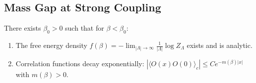 
\subsection{Mass Gap at Strong Coupling}

\begin{theorem}
\label{thm:cluster_proof}
There exists $\beta_0 > 0$ such that for $\beta < \beta_0$:
\begin{enumerate}
\item The free energy density $f(\beta) = -\lim_{|\Lambda| \to \infty} \frac{1}{|\Lambda|}\log Z_\Lambda$ exists and is analytic.
\item Correlation functions decay exponentially: $|\langle O(x) O(0) \rangle_c| \leq C e^{-m(\beta)|x|}$ with $m(\beta) > 0$.
\end{enumerate}
\end{theorem}

